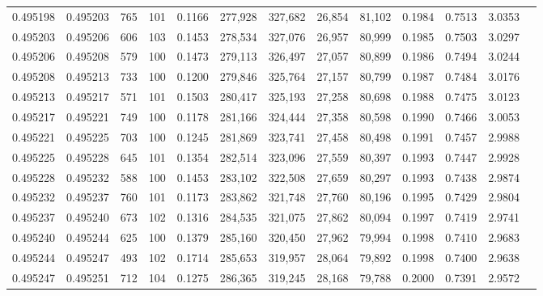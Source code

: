 \begin{tabular}{rrrrrrrrrrrrr}
0.495198 & 0.495203 &   765 & 101 &                                     0.1166 & 277,928 & 327,682 &  26,854 &  81,102 & 0.1984 & 0.7513 & 3.0353 \\
0.495203 & 0.495206 &   606 & 103 &                                     0.1453 & 278,534 & 327,076 &  26,957 &  80,999 & 0.1985 & 0.7503 & 3.0297 \\
0.495206 & 0.495208 &   579 & 100 &                                     0.1473 & 279,113 & 326,497 &  27,057 &  80,899 & 0.1986 & 0.7494 & 3.0244 \\
0.495208 & 0.495213 &   733 & 100 &                                     0.1200 & 279,846 & 325,764 &  27,157 &  80,799 & 0.1987 & 0.7484 & 3.0176 \\
0.495213 & 0.495217 &   571 & 101 &                                     0.1503 & 280,417 & 325,193 &  27,258 &  80,698 & 0.1988 & 0.7475 & 3.0123 \\
0.495217 & 0.495221 &   749 & 100 &                                     0.1178 & 281,166 & 324,444 &  27,358 &  80,598 & 0.1990 & 0.7466 & 3.0053 \\
0.495221 & 0.495225 &   703 & 100 &                                     0.1245 & 281,869 & 323,741 &  27,458 &  80,498 & 0.1991 & 0.7457 & 2.9988 \\
0.495225 & 0.495228 &   645 & 101 &                                     0.1354 & 282,514 & 323,096 &  27,559 &  80,397 & 0.1993 & 0.7447 & 2.9928 \\
0.495228 & 0.495232 &   588 & 100 &                                     0.1453 & 283,102 & 322,508 &  27,659 &  80,297 & 0.1993 & 0.7438 & 2.9874 \\
0.495232 & 0.495237 &   760 & 101 &                                     0.1173 & 283,862 & 321,748 &  27,760 &  80,196 & 0.1995 & 0.7429 & 2.9804 \\
0.495237 & 0.495240 &   673 & 102 &                                     0.1316 & 284,535 & 321,075 &  27,862 &  80,094 & 0.1997 & 0.7419 & 2.9741 \\
0.495240 & 0.495244 &   625 & 100 &                                     0.1379 & 285,160 & 320,450 &  27,962 &  79,994 & 0.1998 & 0.7410 & 2.9683 \\
0.495244 & 0.495247 &   493 & 102 &                                     0.1714 & 285,653 & 319,957 &  28,064 &  79,892 & 0.1998 & 0.7400 & 2.9638 \\
0.495247 & 0.495251 &   712 & 104 &                                     0.1275 & 286,365 & 319,245 &  28,168 &  79,788 & 0.2000 & 0.7391 & 2.9572 \\

\end{tabular}
